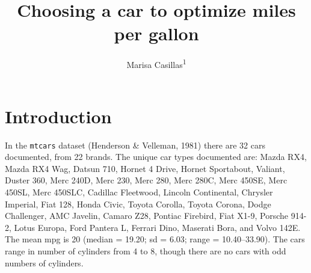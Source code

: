 \documentclass[
  english,
  man,floatsintext]{apa6}
\title{Choosing a car to optimize miles per gallon}
\author{Marisa Casillas\textsuperscript{1}}
\date{}
\affiliation{\vspace{0.5cm}\textsuperscript{1} University of Chicago}
\begin{document}
\maketitle

\hypertarget{introduction}{%
\section{Introduction}\label{introduction}}

In the \texttt{mtcars} dataset (Henderson \& Velleman, 1981) there are 32 cars documented, from 22 brands. The unique car types documented are: Mazda RX4, Mazda RX4 Wag, Datsun 710, Hornet 4 Drive, Hornet Sportabout, Valiant, Duster 360, Merc 240D, Merc 230, Merc 280, Merc 280C, Merc 450SE, Merc 450SL, Merc 450SLC, Cadillac Fleetwood, Lincoln Continental, Chrysler Imperial, Fiat 128, Honda Civic, Toyota Corolla, Toyota Corona, Dodge Challenger, AMC Javelin, Camaro Z28, Pontiac Firebird, Fiat X1-9, Porsche 914-2, Lotus Europa, Ford Pantera L, Ferrari Dino, Maserati Bora, and Volvo 142E. The mean mpg is 20 (median = 19.20; sd = 6.03; range = 10.40--33.90). The cars range in number of cylinders from 4 to 8, though there are no cars with odd numbers of cylinders.
\end{document}
